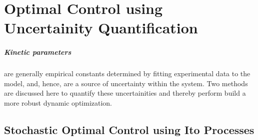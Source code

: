 
\chapter{Optimal Control using Uncertainity Quantification}

\paragraph{Kinetic parameters} are generally empirical constants determined by fitting experimental data to the model, and, hence, are a source of uncertainty within the system. Two methods are discussed here to quantify these uncertainities and thereby perform build a more robust dynamic optimization.

\section{Stochastic Optimal Control using Ito Processes}

